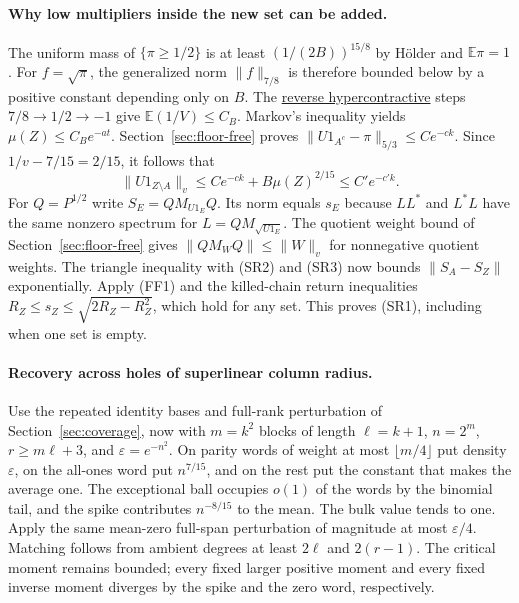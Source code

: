 \paragraph{Why low multipliers inside the new set can be added.}
The uniform mass of $\{\pi\ge1/2\}$ is at least $(1/(2B))^{15/8}$
by H\"older and $\mathbb E\pi=1$. For $f=\sqrt\pi$, the generalized
norm $\|f\|_{7/8}$ is therefore bounded below by a positive constant
depending only on $B$. The \href{https://arxiv.org/abs/1108.1210}{reverse
hypercontractive} steps $7/8\to1/2\to-1$ give
$\mathbb E(1/V)\le C_B$. Markov's inequality yields $\mu(Z)\le C_B e^{-at}$.
Section~\ref{sec:floor-free} proves $\|U1_{A^c}-\pi\|_{5/3}\le Ce^{-ck}$.
Since $1/v-7/15=2/15$, it follows that
\[
 \|U1_{Z\setminus A}\|_v
 \le Ce^{-ck}+B\mu(Z)^{2/15}\le C'e^{-c'k}.               \tag{SR3}
\]
For $Q=P^{1/2}$ write $S_E=QM_{U1_E}Q$. Its norm equals $s_E$ because
$LL^*$ and $L^*L$ have the same nonzero spectrum for $L=QM_{\sqrt{U1_E}}$.
The quotient weight bound of Section~\ref{sec:floor-free} gives
$\|QM_WQ\|\le\|W\|_v$ for nonnegative quotient weights.
The triangle inequality with (SR2) and (SR3) now bounds
$\|S_A-S_Z\|$ exponentially. Apply (FF1) and the killed-chain return
inequalities $R_Z\le s_Z\le\sqrt{2R_Z-R_Z^2}$, which hold for any set.
This proves (SR1), including when one set is empty.

\paragraph{Recovery across holes of superlinear column radius.}
Use the repeated identity bases and full-rank perturbation of
Section~\ref{sec:coverage}, now with $m=k^2$ blocks of length $\ell=k+1$,
$n=2^m$, $r\ge m\ell+3$, and $\varepsilon=e^{-n^2}$. On parity words
of weight at most $\lfloor m/4\rfloor$ put density $\varepsilon$, on
the all-ones word put $n^{7/15}$, and on the rest put the constant
that makes the average one. The exceptional ball occupies $o(1)$ of
the words by the binomial tail, and the spike contributes
$n^{-8/15}$ to the mean. The bulk value tends to one. Apply the same
mean-zero full-span perturbation of magnitude at most $\varepsilon/4$.
Matching follows from ambient degrees at least $2\ell$ and $2(r-1)$.
The critical moment remains bounded; every fixed larger positive moment
and every fixed inverse moment diverges by the spike and the zero word,
respectively.


